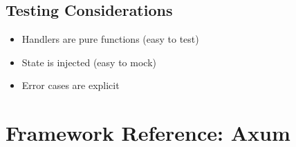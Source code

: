 \subsection{Testing Considerations}

\begin{itemize}
  \item Handlers are pure functions (easy to test)
  \item State is injected (easy to mock)
  \item Error cases are explicit
\end{itemize}

\section{Framework Reference: Axum}
\label{sec:framework-axum}


